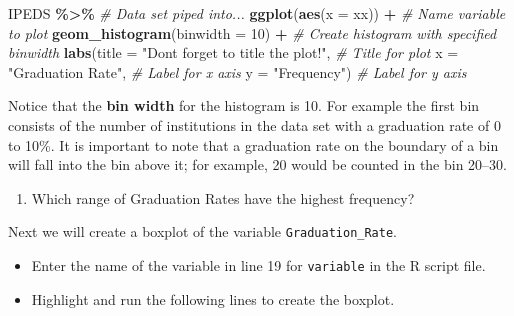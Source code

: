 \documentclass[
]{report}
\newenvironment{Shaded}{\begin{snugshade}}{\end{snugshade}}
\newcommand{\AttributeTok}[1]{\textcolor[rgb]{0.13,0.29,0.53}{#1}}
\newcommand{\CommentTok}[1]{\textcolor[rgb]{0.56,0.35,0.01}{\textit{#1}}}
\newcommand{\DecValTok}[1]{\textcolor[rgb]{0.00,0.00,0.81}{#1}}
\newcommand{\FunctionTok}[1]{\textcolor[rgb]{0.13,0.29,0.53}{\textbf{#1}}}
\newcommand{\NormalTok}[1]{#1}
\newcommand{\SpecialCharTok}[1]{\textcolor[rgb]{0.81,0.36,0.00}{\textbf{#1}}}
\newcommand{\StringTok}[1]{\textcolor[rgb]{0.31,0.60,0.02}{#1}}
\providecommand{\tightlist}{%
  \setlength{\itemsep}{0pt}\setlength{\parskip}{0pt}}
\begin{document}
\begin{Shaded}
\begin{Highlighting}[]
\NormalTok{IPEDS }\SpecialCharTok{\%\textgreater{}\%} \CommentTok{\# Data set piped into...}
\FunctionTok{ggplot}\NormalTok{(}\FunctionTok{aes}\NormalTok{(}\AttributeTok{x =}\NormalTok{ xx)) }\SpecialCharTok{+}   \CommentTok{\# Name variable to plot}
  \FunctionTok{geom\_histogram}\NormalTok{(}\AttributeTok{binwidth =} \DecValTok{10}\NormalTok{) }\SpecialCharTok{+}  \CommentTok{\# Create histogram with specified binwidth}
  \FunctionTok{labs}\NormalTok{(}\AttributeTok{title =} \StringTok{"Don\textquotesingle{}t forget to title the plot!"}\NormalTok{, }\CommentTok{\# Title for plot}
       \AttributeTok{x =} \StringTok{"Graduation Rate"}\NormalTok{, }\CommentTok{\# Label for x axis}
       \AttributeTok{y =} \StringTok{"Frequency"}\NormalTok{) }\CommentTok{\# Label for y axis}
\end{Highlighting}
\end{Shaded}

Notice that the \textbf{bin width} for the histogram is 10. For example the first bin consists of the number of institutions in the data set with a graduation rate of 0 to 10\%. It is important to note that a graduation rate on the boundary of a bin will fall into the bin above it; for example, 20 would be counted in the bin 20--30.

\begin{enumerate}
\def\labelenumi{\arabic{enumi}.}
\setcounter{enumi}{5}
\tightlist
\item
  Which range of Graduation Rates have the highest frequency?
\end{enumerate}

\vspace{0.2in}

Next we will create a boxplot of the variable \texttt{Graduation\_Rate}.

\begin{itemize}
\item
  Enter the name of the variable in line 19 for \texttt{variable} in the R script file.
\item
  Highlight and run the following lines to create the boxplot.
\end{itemize}
\end{document}
